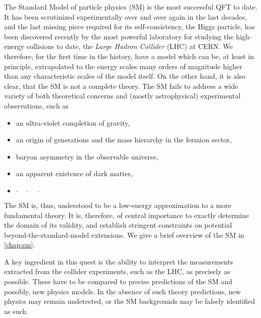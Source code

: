 The Standard Model of particle physics (SM) is the most successful QFT to date.
It has been scrutinized experimentally over and over again in the last decades, and the
last missing piece required for its self-consistency, the Higgs particle, has been discovered recently by the most
powerful laboratory for studying  the high-energy collisions to date, the \emph{Large Hadron Collider} (LHC) at CERN.
We therefore, for the first time in the history, have a model which can be, at least in principle, extrapolated to the energy scales many orders of magnitude higher than
any characteristic scales of the model itself.
On the other hand, it is also clear, that the SM is not a complete theory.
The SM fails to address a wide variety of both theoretical concerns and (mostly astrophysical) experimental observations, such as
\begin{itemize}[nosep,topsep=-1.6ex]
  \item an ultra-violet completion of gravity,
  \item an origin of generations and the mass hierarchy in the fermion sector,
  \item baryon asymmetry in the observable universe, 
  \item an apparent existence of dark matter,
  \item[]  $\cdot\quad\cdot\quad\cdot$ %
\end{itemize}
The SM is, thus, understood to be a low-energy approximation to a more fundamental theory.
It is, therefore, of central importance to exactly determine the domain of its validity,
and establish stringent constraints on potential beyond-the-standard-model extensions.
We give a brief overview of the SM in \cref{chap:sm}.

A key ingredient in this quest is the ability to interpret the measurements extracted from the collider experiments, such as the LHC, as precisely as possible.
These have to be compared to precise predictions of the SM and possibly, new physics models.
In the absence of such theory predictions, new physics may remain undetected, or the SM backgrounds may be falsely identified as such.

